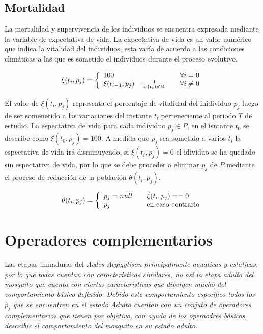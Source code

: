 \subsection{Mortalidad}
La mortalidad y supervivencia de los individuos se encuentra expresada
mediante la variable de expectativa de vida. La expectativa de vida es
un valor numérico que indica la vitalidad del individuos, esta varía de
acuerdo a las condiciones climáticas a las que es sometido el individuos
durante el proceso evolutivo.

\begin{equation}
\xi (t_{i}, p_{j}) = \left\{
  \begin{array}{l l}
    100 & \quad \forall i = 0 \\
    \xi (t_{i-1}, p_{j}) - \frac{1}{\upsilon(t_{i}) * 24} & \quad \forall i \neq 0
  \end{array} \right.
\end{equation}

El valor de $\xi (t_{i}, p_{j})$ representa el porcentaje de vitalidad del
inidividuo $p_{j}$ luego de ser somenetido a las variaciones del instante
$t_{i}$ perteneciente al periodo $T$ de estudio. La espectativa de vida
para cada individuo $p_{j} \in P$, en el isntante $t_{0}$ se describe como
$\xi (t_{0}, p_{j})= 100$. A medida que $p_{j}$ sea sometido a varios
$t_{i}$ la espectativa de vida irá disminuyendo, si $\xi (t_{i}, p_{j})= 0$ el
idividuo se ha quedado sin espectativa de vida, por lo que se debe proceder
a eliminar $p_{j}$ de $P$ mediante el proceso de reducción de la población
$\theta (t_{i}, p_{j})$.

\begin{equation}
\theta (t_{i}, p_{j}) = \left\{
  \begin{array}{l l}
    p_{j} = null & \quad \xi(t_{i}, p_{j}) == 0 \\
    p_{j} & \quad \text{en caso contrario}
  \end{array} \right.
\end{equation}

\section{Operadores complementarios}
Las etapas inmaduras del \em Aedes Aegigyti\em son principalmente acuaticas
y estaticas, por lo que todas cuentan con caracteristicas similares, no
así la etapa adulto del mosquito que cuenta con ciertas caracteristicas
que divergen mucho del comportamiento básico definido. Debido este
comportamiento especifico todos los $p_{j}$ que se encuentren en el estado
\em Adulto \em cuentan con un conjuto de operadores complementarios que
tienen por objetivo, con ayuda de los operaodres básicos, describir el
comportamiento del mosquito en su estado adulto.

